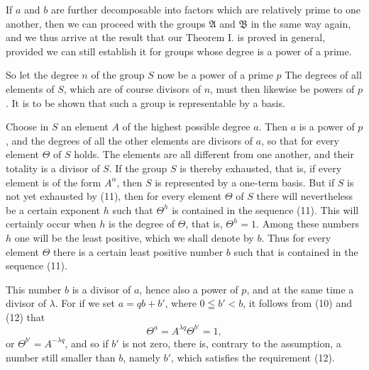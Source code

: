 If $a$ and $b$ are further decomposable into factors which are relatively prime to one another, then we can proceed with the groups $\mathfrak{A}$ and $\mathfrak{B}$ in the same way again, and we thus arrive at the result that our Theorem I. is proved in general, provided we can still establish it for groups whose degree is a power of a prime.

So let the degree $n$ of the group $S$ now be a power of a prime $p$
The degrees of all elements of $S$, which are of course divisors of $n$, must then likewise be powers of $p$. It is to be shown that such a group is representable by a basis.

Choose in $S$ an element $A$ of the highest possible degree $a$. Then $a$ is a power of $p$, and the degrees of all the other elements are divisors of $a$, so that for every element $\Theta$ of $S$
holds. The elements
are all different from one another, and their totality is a divisor of $S$. If the group $S$ is thereby exhausted, that is, if every element is of the form $A^\alpha$, then $S$ is represented by a one-term basis. But if $S$ is not yet exhausted by (11), then for every element $\Theta$ of $S$ there will nevertheless be a certain exponent $h$ such that $\Theta^h$ is contained in the sequence (11). This will certainly occur when $h$ is the degree of $\Theta$, that is, $\Theta^h = 1$. Among these numbers $h$ one will be the least positive, which we shall denote by $b$. Thus for every element $\Theta$ there is a certain least positive number $b$ such that
is contained in the sequence (11).

This number $b$ is a divisor of $a$, hence also a power of $p$, and at the same time a divisor of $\lambda$. For if we set $a = qb + b'$, where $0 \leqq b' < b$, it follows from (10) and (12) that
\[
\Theta^a = A^{\lambda q} \Theta^{b'} = 1,
\]
or $\Theta^{b'} = A^{-\lambda q}$, and so if $b'$ is not zero, there is, contrary to the assumption, a number still smaller than $b$, namely $b'$, which satisfies the requirement (12).
